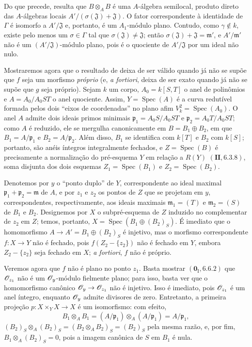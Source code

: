 \begin{env}[11.7.1]
Do que precede, resulta que
$B\otimes_A B$ é uma
$A$-álgebra semilocal,
produto direto das
$A$-álgebras locais
$A'/(\sigma(\mathfrak J)
+\mathfrak J)$.
O fator correspondente à
identidade de $\Gamma$ é
isomorfo a $A'/\mathfrak J$
e, portanto, é um
$A_1$-módulo plano. Contudo,
como $\gamma\notin k$, existe
pelo menos um
$\sigma\in\Gamma$ tal que
$\sigma(\mathfrak J)
\ne\mathfrak J$; então
$\sigma(\mathfrak J)
+\mathfrak J=\mathfrak m'$,
e $A'/\mathfrak m'$ não é um
$(A'/\mathfrak J)$-módulo
plano, pois é o quociente
de $A'/\mathfrak J$ por um
ideal não nulo.
\end{env}

\begin{env}[11.7.2]
\label{IV.11.7.2}
Mostraremos agora que o
resultado de 
deixa de ser válido quando
já não se supõe que $f$ seja
um morfismo \emph{próprio}
(e, \emph{a fortiori},
 deixa de
ser exato quando já não se
supõe que $g$ seja próprio).
Sejam $k$ um corpo,
$A_0=k[S,T]$ o anel de
polinômios e
$A=A_0/A_0ST$ o anel quociente.
Assim, $Y=\operatorname{Spec}(A)$
é a curva redutível formada
pelos dois ``eixos de
coordenadas'' no plano afim
$V_k^2=\operatorname{Spec}(A_0)$.
O anel $A$ admite dois ideais
primos minimais
$\mathfrak p_1=A_0S/A_0ST$ e
$\mathfrak p_2=A_0T/A_0ST$;
como $A$ é reduzido, ele se
mergulha canonicamente em
$B=B_1\oplus B_2$, em que
$B_1=A/\mathfrak p_1$ e
$B_2=A/\mathfrak p_2$.
Além disso, $B_1$ se identifica
com $k[T]$ e $B_2$ com $k[S]$;
portanto, são anéis íntegros
integralmente fechados, e
$Z=\operatorname{Spec}(B)$
é precisamente a normalização
do pré-esquema $Y$ em relação
a $R(Y)$ $(\mathbf{II},6.3.8)$,
soma disjunta dos dois esquemas
$Z_1=\operatorname{Spec}(B_1)$
e $Z_2=\operatorname{Spec}(B_2)$.

Denotemos por $y$ o ``ponto
duplo'' de $Y$, correspondente
ao ideal maximal
$\mathfrak p_1+\mathfrak p_2
=\mathfrak m$ de $A$, e por
$z_1$ e $z_2$ os pontos de
$Z$ que se projetam em $y$,
correspondentes, respectivamente,
aos ideais maximais
$\mathfrak m_1=(T)$ e
$\mathfrak m_2=(S)$ de $B_1$
e $B_2$. Designemos por $X$
o subpré-esquema de $Z$
induzido no complementar de
$z_2$ em $Z$; temos, portanto,
$X=\operatorname{Spec}(B_1
\oplus(B_2)_S)$. É imediato
que o homomorfismo
$A\to A'=B_1\oplus(B_2)_S$
é injetivo, mas o morfismo
correspondente $f:X\to Y$
não é fechado, pois
$f(Z_2-\{z_2\})$ não é fechado
em $Y$, embora $Z_2-\{z_2\}$
seja fechado em $X$;
\emph{a fortiori}, $f$ não é
próprio.

Veremos agora que $f$ não é
plano no ponto $z_1$. Basta
mostrar $(\mathbf 0_{\mathrm I},6.6.2)$
que $\mathscr{O}_{z_1}$ não é um
$\mathscr{O}_y$-módulo fielmente
plano; para isso, basta ver
que o homomorfismo canônico
$\sh{O}_y\to\sh{O}_{z_1}$
não é injetivo. Isso é
imediato, pois $\mathscr{O}_{z_1}$
é um anel íntegro, enquanto
$\mathscr{O}_y$ admite divisores
de zero. Entretanto, a
primeira projeção
$p:X\times_Y X\to X$ é um
isomorfismo: com efeito,
\[
B_1\otimes_A B_1
=(A/\mathfrak p_1)
\otimes_A(A/\mathfrak p_1)
=A/\mathfrak p_1,
\]
$(B_2)_S\otimes_A(B_2)_S
=(B_2\otimes_A B_2)_S
=(B_2)_S$ pela mesma razão,
e, por fim,
$B_1\otimes_A(B_2)_S=0$,
pois a imagem canônica de
$S$ em $B_1$ é nula.
\end{env}

